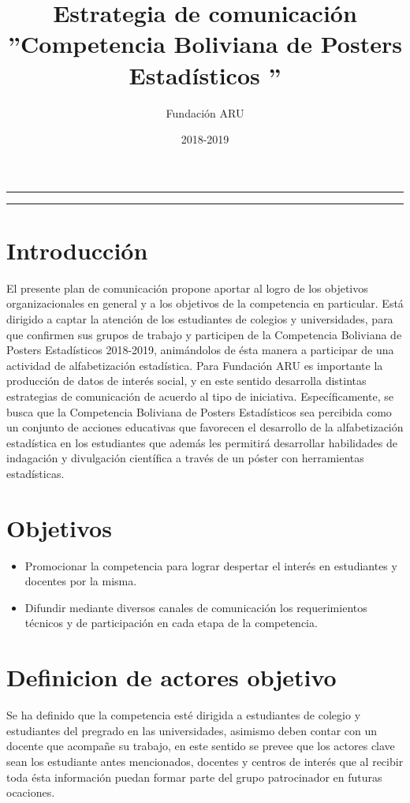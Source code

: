\documentclass{article}
\title{\textbf{Estrategia de comunicación} \\ ''Competencia Boliviana de Posters Estadísticos ''}
\author{Fundación ARU}
\date{2018-2019 }
\begin{document}
\maketitle

\hrule
\hrule
\newpage

\section{Introducción}

El presente plan de comunicación propone aportar al logro de los objetivos organizacionales en general y a los objetivos de la competencia en particular. Está dirigido a captar la atención de los estudiantes de colegios y universidades, para que confirmen sus grupos de trabajo y participen de la Competencia Boliviana de Posters Estadísticos 2018-2019, animándolos de ésta manera a participar de una actividad de alfabetización estadística.
Para Fundación ARU es importante la producción de datos de interés social, y en este sentido desarrolla distintas estrategias de comunicación de acuerdo al tipo de iniciativa. Específicamente, se busca que la Competencia Boliviana de Posters Estadísticos sea percibida como un conjunto de acciones educativas que favorecen el desarrollo de la alfabetización estadística en los estudiantes que además les permitirá desarrollar habilidades de indagación y divulgación científica a través de un póster con herramientas estadísticas.

\section{Objetivos}


\begin{itemize}
\item	Promocionar la competencia para lograr despertar el interés en estudiantes y docentes por la misma. 

\item	Difundir mediante diversos canales de comunicación los requerimientos técnicos y de participación en cada etapa de la competencia.
\end{itemize} 

\section{Definicion de actores objetivo}


Se ha definido que la competencia esté dirigida a estudiantes de colegio y estudiantes del pregrado en las universidades, asimismo deben contar con un docente que acompañe su trabajo, en este sentido se prevee que los actores clave sean los estudiante antes mencionados, docentes y centros de interés que al recibir toda ésta información puedan formar parte del grupo patrocinador en futuras ocaciones. \\
\end{document}
